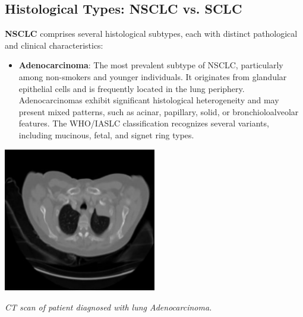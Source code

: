 
\subsection{Histological Types: NSCLC vs. SCLC}

\textbf{NSCLC} comprises several histological subtypes, each with distinct pathological and clinical 
characteristics:

\begin{itemize}
    \item \textbf{Adenocarcinoma}: The most prevalent subtype of NSCLC, particularly among 
    non-smokers and younger individuals. It originates from glandular epithelial cells and is 
    frequently located in the lung periphery. Adenocarcinomas exhibit significant histological 
    heterogeneity and may present mixed patterns, such as acinar, papillary, solid, or 
    bronchioloalveolar features. The WHO/IASLC classification recognizes several variants, including 
    mucinous, fetal, and signet ring types. \cite{nlm2025}
\end{itemize}

\vspace{1em}
\begin{center}
    \includegraphics[width=0.5\textwidth]{../assets/01-overview/lc-adc-ct.jpeg}

    \small\textit{CT scan of patient diagnosed with lung Adenocarcinoma. \cite{SHATNAWI2025100188}}
\end{center}
\vspace{1em}

